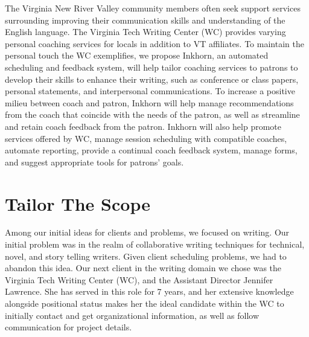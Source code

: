 \documentclass[12pt]{article} %
\begin{document}
The Virginia New River Valley community members often seek support services surrounding improving their communication skills and understanding of the English language.
The Virginia Tech Writing Center (WC) provides varying personal coaching services for locals in addition to VT affiliates.
To maintain the personal touch the WC exemplifies, we propose Inkhorn, an automated scheduling and feedback system, will help tailor coaching services to patrons to develop their skills to enhance their writing, such as conference or class papers, personal statements, and interpersonal communications. 
To increase a positive milieu between coach and patron, Inkhorn will help manage recommendations from the coach that coincide with the needs of the patron, as well as streamline and retain coach feedback from the patron.
Inkhorn will also help promote services offered by WC, manage session scheduling with compatible coaches, automate reporting, provide a continual coach feedback system, manage forms, and suggest appropriate tools for patrons' goals.

\section{Tailor The Scope} %
  Among our initial ideas for clients and problems, we focused on writing.
  Our initial problem was in the realm of collaborative writing techniques for technical, novel, and story telling writers.
  Given client scheduling problems, we had to abandon this idea.
  Our next client in the writing domain we chose was the Virginia Tech Writing Center (WC), and the Assistant Director Jennifer Lawrence.
  She has served in this role for 7 years, and her extensive knowledge alongside positional status makes her the ideal candidate within the WC to initially contact and get organizational information, as well as follow communication for project details.
\end{document}
